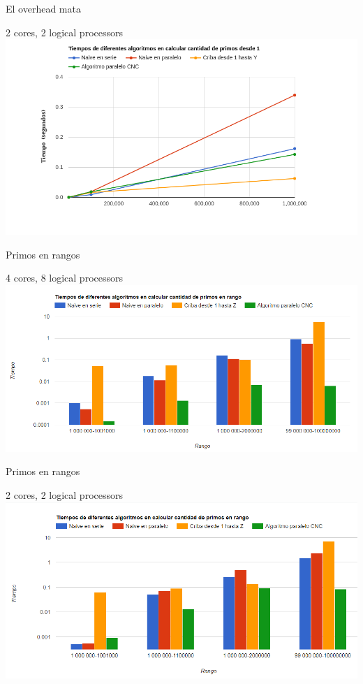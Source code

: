 \documentclass[compress]{beamer}
\begin{document}
\begin{frame}{El overhead mata}
  \begin{center}
  {2 cores, 2 logical processors}
  \\
  \includegraphics[width=1\textwidth]{imagenes/principioLucas.png}%
  \end{center}
\end{frame}

\begin{frame}{Primos en rangos}
  \begin{center}
  {4 cores, 8 logical processors}
  \\
  \includegraphics[width=1\textwidth]{imagenes/julian_rangos.png}%
  \end{center}
\end{frame}

\begin{frame}{Primos en rangos}
  \begin{center}
  {2 cores, 2 logical processors}
  \\
  \includegraphics[width=1\textwidth]{imagenes/lucas_rangos.png}%
  \end{center}
\end{frame}
\end{document}
